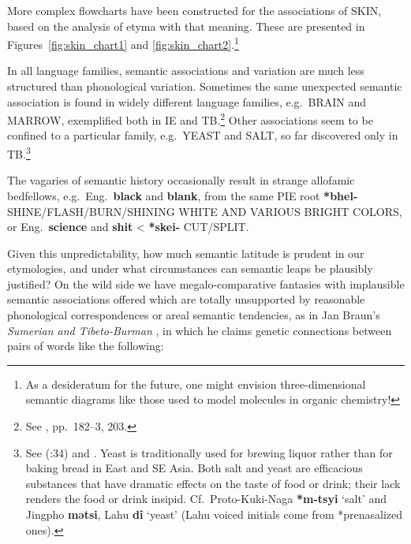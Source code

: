 More complex flowcharts have been constructed for the associations of SKIN, based on the analysis of etyma with that meaning. These are presented in Figures~\ref{fig:skin_chart1} and \ref{fig:skin_chart2}.\footnote{As a desideratum for the future, one might envision three-dimensional semantic diagrams like those used to model molecules in organic chemistry!}

\begin{figure*}[ht]
\centering
{}
\caption{SKIN flowchart \#1}
\label{fig:skin_chart1}
\end{figure*}

\begin{figure*}[ht]
\centering
{}
\caption{SKIN flowchart \#2}
\label{fig:skin_chart2}
\end{figure*}


In all language families, semantic associations and variation are much less structured than phonological variation. Sometimes the same unexpected semantic association is found in widely different language families, e.g.\ BRAIN and MARROW, exemplified both in IE and TB.\footnote{See \textit{}, pp.~182–3, 203.} Other associations seem to be confined to a particular family, e.g.\ YEAST and SALT, so far discovered only in TB.\footnote{See \citealt{JAM-HPTB} (\textit{}:34) and \citeyear{JAM-OER}. Yeast is traditionally used for brewing liquor rather than for baking bread in East and SE Asia. Both salt and yeast are efficacious substances that have dramatic effects on the taste of food or drink; their lack renders the food or drink insipid. Cf.\ Proto-Kuki-Naga \textbf{*m-tsyi} ‘salt’ and Jingpho \textbf{mətsi}, Lahu \textbf{dî} ‘yeast’ (Lahu voiced initials come from *prenasalized ones).}

The vagaries of semantic history occasionally result in strange allofamic bedfellows, e.g.\ Eng.\ \textbf{black} and \textbf{blank}, from the same PIE root \textbf{*bhel-} SHINE/FLASH/BURN/SHINING WHITE AND VARIOUS BRIGHT COLORS, or Eng.\ \textbf{science} and \textbf{shit} < \textbf{*skei-} CUT/SPLIT.

Given this unpredictability, how much semantic latitude is prudent in
our etymologies, and under what circumstances can semantic leaps be
plausibly justified? On the wild side we have megalo-comparative
fantasies with implausible semantic associations offered which are
totally unsupported by reasonable phonological correspondences or
areal semantic tendencies, as in Jan Braun’s \textit{Sumerian and
Tibeto-Burman} \citeyearpar{JB-STB}, in which he claims genetic connections between
pairs of words like the following:

